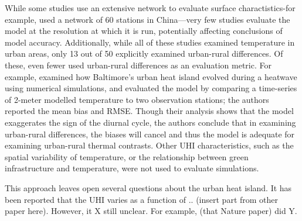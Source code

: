 \documentclass[draft,linenumbers]{agujournal}
\begin{document}

While some studies use an extensive network to evaluate surface charactistics-for example, \cite{miao2011impacts} used a network of 60 stations in China---very few studies evaluate the model at the resolution at which it is run, potentially affecting conclusions of model accuracy. Additionally, while all of these studies examined temperature in urban areas, only 13 out of 50 explicitly examined urban-rural differences. Of these, even fewer used urban-rural differences as an evaluation metric. For example, \citet{li2013synergistic} examined how Baltimore's urban heat island evolved during a heatwave using numerical simulations, and evaluated the model by comparing a time-series of 2-meter modelled temperature to two observation stations; the authors reported the mean bias and RMSE. Though their analysis shows that the model exaggerates the sign of the diurnal cycle, the authors conclude that in examining urban-rural differences, the biases will cancel and thus the model is adequate for examining urban-rural thermal contrasts.  Other UHI characteristics, such as the spatial variability of temperature, or the relationship between green infrastructure and temperature, were not used to evaluate simulations. 

This approach leaves open several questions about the urban heat island. It has been reported that the UHI varies as a function of .. (insert part from other paper here). However, it X still unclear. For example, (that Nature paper) did Y.  
\end{document}
